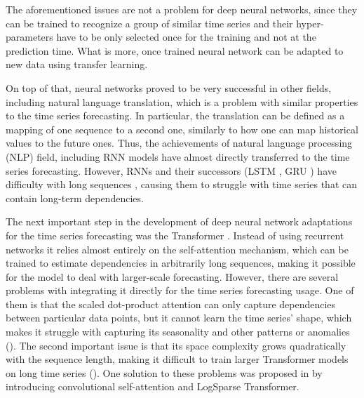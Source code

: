 \documentclass[en]{pracamgr}
\begin{document}
The aforementioned issues are not a problem for deep neural networks, since they can be trained to recognize a group of similar time series and their hyper-parameters have to be only selected once for the training and not at the prediction time. What is more, once trained neural network can be adapted to new data using transfer learning. 

On top of that, neural networks proved to be very successful in other fields, including natural language translation, which is a problem with similar properties to the time series forecasting. In particular, the translation can be defined as a mapping of one sequence to a second one, similarly to how one can map historical values to the future ones. Thus, the achievements of natural language processing (NLP) field, including RNN models have almost directly transferred to the time series forecasting. However, RNNs and their successors (LSTM \cite{lstm}, GRU \cite{gru}) have difficulty with long sequences \cite{context}, causing them to struggle with time series that can contain long-term dependencies.

The next important step in the development of deep neural network adaptations for the time series forecasting was the Transformer \cite{tr}. Instead of using recurrent networks it relies almost entirely on the self-attention mechanism, which can be trained to estimate dependencies in arbitrarily long sequences, making it possible for the model to deal with larger-scale forecasting.
However, there are several problems with integrating it directly for the time series forecasting usage. One of them is that the scaled dot-product attention can only capture dependencies between particular data points, but it cannot learn the time series' shape, which makes it struggle with capturing its seasonality and other patterns or anomalies (\cite{enhancing}). The second important issue is that its space complexity grows quadratically with the sequence length, making it difficult to train larger Transformer models on long time series (\cite{enhancing}).
One solution to these problems was proposed in \cite{enhancing} by introducing convolutional self-attention and LogSparse Transformer.





%
\end{document}
